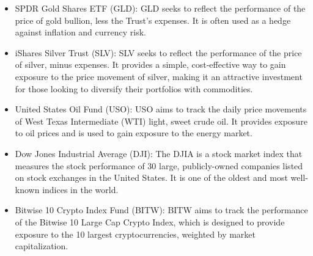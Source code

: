 \begin{itemize}[itemsep=1em]
    \item SPDR Gold Shares ETF (GLD): GLD seeks to reflect the performance of the price of gold bullion, less the Trust’s expenses. It is often used as a hedge against inflation and currency risk.
    \item iShares Silver Trust (SLV): SLV seeks to reflect the performance of the price of silver, minus expenses. It provides a simple, cost-effective way to gain exposure to the price movement of silver, making it an attractive investment for those looking to diversify their portfolios with commodities.
    \item United States Oil Fund (USO): USO aims to track the daily price movements of West Texas Intermediate (WTI) light, sweet crude oil. It provides exposure to oil prices and is used to gain exposure to the energy market.
    \item Dow Jones Industrial Average (DJI): The DJIA is a stock market index that measures the stock performance of 30 large, publicly-owned companies listed on stock exchanges in the United States. It is one of the oldest and most well-known indices in the world.
    \item Bitwise 10 Crypto Index Fund (BITW): BITW aims to track the performance of the Bitwise 10 Large Cap Crypto Index, which is designed to provide exposure to the 10 largest cryptocurrencies, weighted by market capitalization.
\end{itemize}





